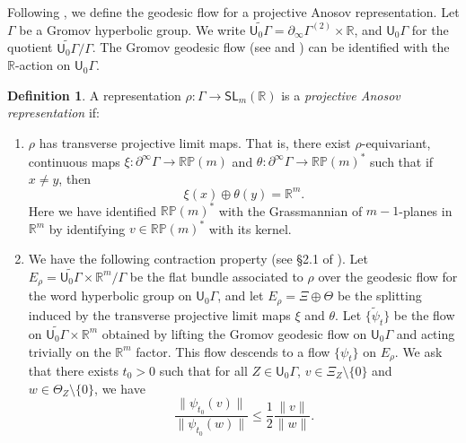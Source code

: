 \documentclass[10pt]{amsart}
\theoremstyle{definition}
\newtheorem{defn}[thm]{Definition}
\numberwithin{equation}{section}
\begin{document}
Following \cite{bcls}, we define the geodesic flow for a projective Anosov representation. Let $\Gamma$ be a Gromov hyperbolic group. We write $\widetilde{\mathsf{U}_0\Gamma} = \partial_\infty \Gamma^{(2)} \times \mathbb R$, and $\mathsf{U}_0\Gamma$ for the quotient $\widetilde{\mathsf{U}_0\Gamma}/\Gamma$. The Gromov geodesic flow (see \cite{champetier} and \cite{mineyev}) can be identified with the $\mathbb R$-action on $\mathsf{U}_0\Gamma$.
\begin{defn}
A representation $\rho:\Gamma\to\mathsf{SL}_m(\mathbb{R})$ is a \emph{projective Anosov representation} if:
\begin{enumerate}
\item $\rho$ has transverse projective limit maps. That is, there exist $\rho$-equivariant, continuous maps $\xi:\partial^\infty\Gamma \to \mathbb{RP}(m)$ and $\theta:\partial^\infty\Gamma \to \mathbb{RP}(m)^*$ such that if $x\neq y$, then
\[ \xi(x) \oplus \theta(y) = \mathbb{R}^m.\]
Here we have identified $\mathbb{RP}(m)^*$ with the Grassmannian of $m-1$-planes in $\mathbb{R}^m$ by identifying $v\in\mathbb{RP}(m)^*$ with its kernel.

\item We have the following contraction property (see \S2.1 of \cite{bcls}). Let $E_\rho = \widetilde{\mathsf{U}_0\Gamma} \times \mathbb R^{m}/ \Gamma$ be the flat bundle associated to $\rho$ over the geodesic flow for the word hyperbolic group on $\mathsf{U}_0\Gamma$, and let $E_\rho = \Xi \oplus \Theta$ be the splitting induced by the transverse projective limit maps $\xi$ and $\theta$. Let $\{\tilde \psi_t\}$ be the flow on $\widetilde{\mathsf{U}_0\Gamma} \times \mathbb R^{m}$ obtained by lifting the Gromov geodesic flow on $\mathsf{U}_0\Gamma$ and acting trivially on the $\mathbb R^m$ factor. This flow descends to a flow $\{\psi_t\}$ on $E_\rho$. We ask that there exists $t_0>0$ such that for all $Z\in \mathsf{U}_0\Gamma$, $v \in \Xi_Z\setminus\{0\}$ and $w \in \Theta_Z \setminus \{ 0\}$, we have
\[ \frac{\| \psi_{t_0} (v) \|}{\| \psi_{t_0} (w) \|} \leq \frac{1}{2} \frac{ \| v \|}{\| w \|}. \] 
\end{enumerate}
\end{defn}
\end{document}
